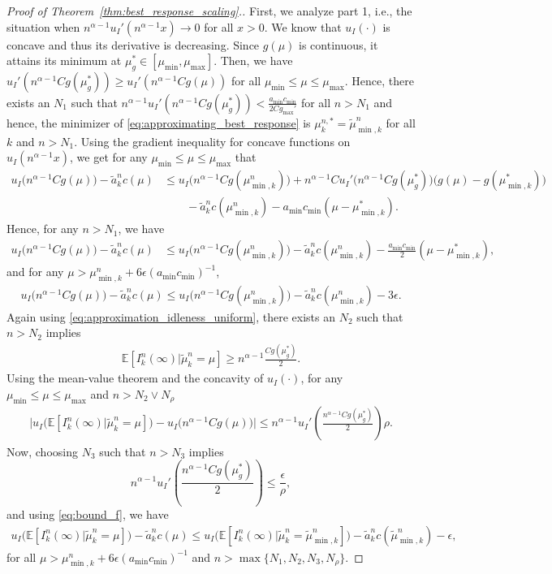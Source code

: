 \documentclass[a4paper,11pt,twoside]{article}
\numberwithin{equation}{section}
\numberwithin{figure}{section}
\theoremstyle{plain}
\newcommand{\EE}{\mathbb{E}}
\newcommand{\1}{\mathbbm{1}}
\begin{document}
\begin{proof}[Proof of Theorem~\ref{thm:best_response_scaling}.]
First, we analyze part 1, i.e., the situation when $n^{\alpha-1}u_I'(n^{\alpha-1}x)\to 0$ for all $x>0$. We know that $u_I(\cdot)$ is concave and thus its derivative is decreasing. Since $g(\mu)$ is continuous, it attains its minimum at $\mu_g^*\in[\mu_{\min}, \mu_{\max}]$. Then, we have $u_I'(n^{\alpha-1}Cg(\mu_g^*))\geq u_I'(n^{\alpha-1}Cg(\mu))$ for all $\mu_{\min}\leq \mu \leq \mu_{\max}$. Hence, there exists an $N_{1}$ such that $n^{\alpha-1}u_I'(n^{\alpha-1}Cg(\mu_g^*))<\frac{a_{\min}c_{\min}}{2Cg_{\max}'}$ for all $n>N_{1}$ and hence, the minimizer of \eqref{eq:approximating_best_response} is $\mu_k^{n,*}=\tilde{\mu}_{\min,k}^n$ for all $k$ and $n>N_1$. Using the gradient inequality for concave functions on $u_I(n^{\alpha-1}x)$, we get for any $\mu_{\min}\leq \mu\leq \mu_{\max}$ that  
\begin{align*}
u_I\big(n^{\alpha-1}Cg(\mu)\big)
-\tilde{a}_k^nc(\mu)
&
\leq 
u_I\big(n^{\alpha-1}Cg(\mu_{\min,k}^n)\big)
+n^{\alpha-1}Cu_I'\big(n^{\alpha-1}Cg(\mu_g^*)\big)\big(g(\mu)-g(\mu_{\min,k}^*)\big)
\\
&\qquad-\tilde{a}_k^nc(\mu_{\min,k}^n)-a_{\min}c_{\min}(\mu-\mu_{\min,k}^*).
\end{align*}
Hence, for any $n>N_1$, we have 
\begin{align*}
u_I\big(n^{\alpha-1}Cg(\mu)\big)-\tilde{a}_k^nc(\mu)
&
\leq u_I\big(n^{\alpha-1}Cg(\mu_{\min,k}^n)\big) -\tilde{a}_k^nc(\mu_{\min,k}^n)-\frac{a_{\min}c_{\min}}{2}(\mu-\mu_{\min,k}^*),
\end{align*}
and 
for any $\mu>\mu_{\min,k}^n + 6\epsilon(a_{\min}c_{\min})^{-1}$, 
\begin{align}\label{eq:bound_f}
    u_I\big(n^{\alpha-1}Cg(\mu)\big)
    -\tilde{a}_k^nc(\mu)
    \leq u_I\big(n^{\alpha-1}Cg(\mu_{\min,k}^n)\big) -\tilde{a}_k^nc(\mu_{\min,k}^n)-3\epsilon.
\end{align}
Again using \eqref{eq:approximation_idleness_uniform}, there exists an $N_2$ such that $n>N_2$ implies
\begin{align*}
    \EE[I_k^n(\infty)|\tilde{\mu}_k^n=\mu]\geq n^{\alpha-1}\frac{Cg(\mu_g^*)}{2}.
\end{align*}
Using the mean-value theorem and the concavity of $u_I(\cdot)$, for any $\mu_{\min}\leq \mu \leq \mu_{\max}$ and  $n>N_2\vee N_\rho$ 
\begin{align*}
    \Big|u_I\big(\EE[I_k^n(\infty)|\tilde{\mu}_k^n=\mu]\big)
    -u_I\big ( n^{\alpha-1}Cg(\mu)\big) \Big|
    \leq 
    n^{\alpha-1}u_I'\left(\frac{n^{\alpha-1}Cg(\mu_g^*)}{2}\right)\rho.
\end{align*}
Now, choosing $N_3$ such that $n>N_3$ implies
\[
n^{\alpha-1}u_I'\left(\frac{n^{\alpha-1}Cg(\mu_g^*)}{2}\right)\leq \frac{\epsilon}{\rho},
\]
and using \eqref{eq:bound_f}, we have 
\begin{align*}
    u_I\big(\EE[I_k^n(\infty)|\tilde{\mu}_k^n=\mu]\big)-\tilde{a}_k^nc(\mu)\leq u_I\big(\EE[I_k^n(\infty)|\tilde{\mu}_k^n=\tilde{\mu}_{\min,k}^n]\big) -\tilde{a}_k^nc(\tilde{\mu}_{\min,k}^n)-\epsilon,
\end{align*}
for all $\mu>\mu_{\min,k}^n + 6\epsilon(a_{\min}c_{\min})^{-1}$ and $n>\max\{N_1, N_2, N_3, N_\rho\}$.


\end{proof}
\end{document}
